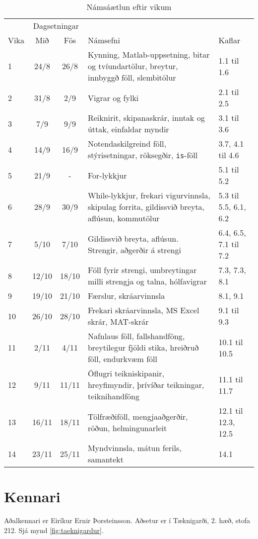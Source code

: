 \documentclass[justified, nobib]{tufte-handout}
\begin{document}
\begin{table*}
\caption{Námsáætlun eftir vikum}
\label{tab:schedule}
\begin{center}
\renewcommand{\arraystretch}{1.2}
\begin{tabularx}{\linewidth}{lccXp{3cm}}
\toprule
&\multicolumn{2}{c}{Dagsetningar}&&\\
\cmidrule{2-3}
Vika&Mið&Fös&Námsefni&Kaflar\\
\midrule
1	&24/8	&26/8	& Kynning, Matlab-uppsetning, bitar og tvíundartölur, breytur, innbyggð föll, slembitölur &1.1 til 1.6\\
2	&31/8	&2/9	& Vigrar og fylki&2.1 til 2.5\\
3	&7/9	&9/9	& Reiknirit, skipanaskrár, inntak og úttak, einfaldar myndir&3.1 til 3.6\\
4	&14/9	&16/9	& Notendaskilgreind föll, stýrisetningar, röksegðir, \texttt{is}-föll&3.7, 4.1 til 4.6\\
5	&21/9	&-	& For-lykkjur&5.1 til 5.2\\
6	&28/9	&30/9	& While-lykkjur, frekari vigurvinnsla, skipulag forrita, gildissvið breyta, aflúsun, kommutölur&5.3 til 5.5, 6.1, 6.2\\
7	&5/10	&7/10	& Gildissvið breyta, aflúsun. Strengir, aðgerðir á strengi&6.4, 6.5, 7.1 til 7.2\\
8	&12/10	&18/10	& Föll fyrir strengi, umbreytingar milli strengja og talna, hólfavigrar&7.3, 7.3, 8.1\\
9	&19/10	&21/10	& Færslur, skráarvinnsla&8.1, 9.1\\
10	&26/10	&28/10	& Frekari skráarvinnsla, MS Excel skrár, MAT-skrár&9.1 til 9.3\\
11	&2/11	&4/11	& Nafnlaus föll, fallshandföng, breytilegur fjöldi stika, hreiðruð föll, endurkvæm föll&10.1 til 10.5\\
12	&9/11	&11/11	& Öflugri teikniskipanir, hreyfimyndir, þrívíðar teikningar, teiknihandföng&11.1 til 11.7\\
13	&16/11	&18/11	& Tölfræðiföll, mengjaaðgerðir, röðun, helmingunarleit&12.1 til 12.3, 12.5\\
14	&23/11	&25/11	& Myndvinnsla, mátun ferils, samantekt&14.1\\
\bottomrule
\end{tabularx}
\end{center}
\end{table*}

\section{Kennari}
Aðalkennari er Eiríkur Ernir Þorsteinsson. Aðsetur er í Tæknigarði, 2. hæð, stofa 212. Sjá mynd \ref{fig:taeknigardur}.
\end{document}
